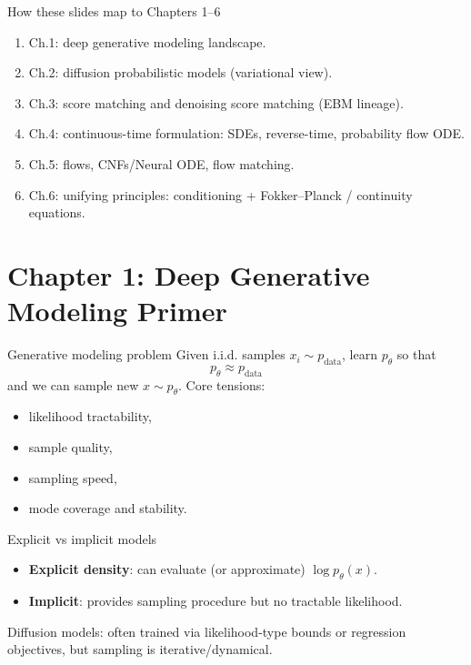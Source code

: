 \documentclass[aspectratio=169]{beamer}
\begin{document}
\begin{frame}{How these slides map to Chapters 1--6}
\begin{enumerate}
\item Ch.1: deep generative modeling landscape.
\item Ch.2: diffusion probabilistic models (variational view).
\item Ch.3: score matching and denoising score matching (EBM lineage).
\item Ch.4: continuous-time formulation: SDEs, reverse-time, probability flow ODE.
\item Ch.5: flows, CNFs/Neural ODE, flow matching.
\item Ch.6: unifying principles: conditioning + Fokker--Planck / continuity equations.
\end{enumerate}
\end{frame}

\section{Chapter 1: Deep Generative Modeling Primer}

\begin{frame}{Generative modeling problem}
Given i.i.d. samples \(x_i\sim p_{\text{data}}\), learn \(p_\theta\) so that
\[
p_\theta \approx p_{\text{data}}
\]
and we can sample new \(x\sim p_\theta\).
Core tensions:
\begin{itemize}
\item likelihood tractability,
\item sample quality,
\item sampling speed,
\item mode coverage and stability.
\end{itemize}
\end{frame}

\begin{frame}{Explicit vs implicit models}
\begin{itemize}
\item \textbf{Explicit density}: can evaluate (or approximate) \(\log p_\theta(x)\).
\item \textbf{Implicit}: provides sampling procedure but no tractable likelihood.
\end{itemize}
Diffusion models: often trained via likelihood-type bounds or regression objectives, but sampling is iterative/dynamical.
\end{frame}
\end{document}
